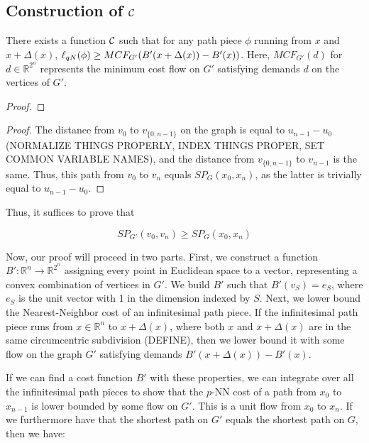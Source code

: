 \subsection{Construction of $\mathcal{C}$}
\begin{lemma}\label{lem:flow} There exists a function $\mathcal{C}$ such that for
any
path piece $\phi$ running from $x$ and $x+\Delta(x)$, $\ell_{qN}(\phi) \geq
MCF_{G'}(B'(x+\Delta(x))-B'(x))$. Here, $MCF_{G'}(d)$ for $d \in
\mathbb{R}^{2^n}$ represents the minimum cost flow on $G'$ satisfying demands
$d$ on the vertices of $G'$.

\end{lemma}

\begin{proof}
\end{proof}

\begin{proof}

The distance from $v_0$ to $v_{\{0,n-1\}}$ on the graph is equal to
$u_{n-1}-u_0$ (NORMALIZE THINGS PROPERLY, INDEX THINGS PROPER, SET COMMON
VARIABLE NAMES), and the distance from $v_{\{0, n-1\}}$ to $v_{n-1}$ is the
same. Thus, this path from $v_0$ to $v_n$ equals $SP_G(x_0, x_n)$, as the
latter is trivially equal to $u_{n-1} - u_0$.

\end{proof}

Thus, it suffices to prove that

\[ SP_{G'}(v_0, v_n) \geq SP_G(x_0, x_n) \]




Now, our proof will proceed in two parts. First, we construct a function
$B':\mathbb{R}^n \rightarrow \mathbb{R}^{2^n}$ assigning every point in
Euclidean space to a vector, representing a convex combination of vertices in
$G'$. We build $B'$ such that $B'(v_S)= e_S$, where $e_S$ is the unit vector
with $1$ in the dimension indexed by $S$. Next, we lower bound the
Nearest-Neighbor cost of an infinitesimal path piece. If the infinitesimal path
piece runs from $x \in \mathbb{R}^n$ to $x+\Delta(x)$, where both $x$ and
$x+\Delta(x)$ are in the same circumcentric subdivision (DEFINE), then we lower
bound it with some flow on the graph $G'$ satisfying demands $B'(x+\Delta(x)) -
B'(x)$.

If we can find a cost function $B'$ with these properties, we can integrate
over all the infinitesimal path pieces to show that the $p$-NN cost of a path
from $x_0$ to $x_{n-1}$ is lower bounded by some flow on $G'$. This is a unit
flow from $x_0$ to $x_n$. If we furthermore have that the shortest path on $G'$
equals the shortest path on $G$, then we have:

